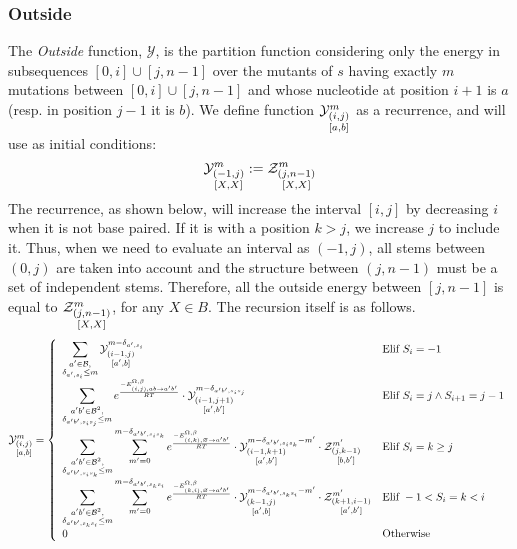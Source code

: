\subsubsection{Outside}	
The \emph{Outside} function, $\mathcal Y$, is the partition function considering only the 
energy in subsequences $[0,i]\cup[j,n-1]$ over the mutants of $s$ having exactly $m$ mutations between $[0,i]\cup[j,n-1]$ and whose nucleotide at position $i+1$ is $a$ 
(resp. in position $j-1$ it is $b$).
We define function $\Y{i,j}{m}{a,b}$ as a recurrence, and will use as initial conditions:
\begin{equation}
	\Y{-1,j}{m}{X,X}:=
		\displaystyle
	  \Z{j,n-1}{m}{X,X}
\label{eq:Y_in}
\end{equation}
The recurrence, as shown below, will increase the interval $[i,j]$ by decreasing $i$ when
it is not base paired. If it is with a position $k>j$, we increase $j$ to include it.
 Thus, when we need
to evaluate an interval as $(-1,j)$, all stems between $(0,j)$ are taken into account and the
structure between $(j,n-1)$ must be a set of independent stems. Therefore,
 all the outside energy between $[j,n-1]$ is
equal to $\Z{j,n-1}{m}{X,X}$, for any $X\in B$. The recursion itself is as follows.
\begin{equation}
	\Y{i,j}{m}{a,b} = \left\{
  \begin{array}{ll}
		\displaystyle
    \sum_{\substack{a'\in \B,\\ \Kron_{a',s_i}\le m}}
    \Y{i-1,j}{m- \Kron_{a',s_i}}{a',b} &
    \text{Elif }S_i=-1 \\
    \displaystyle
    \sum_{\substack{a'b'\in \B^2,\\ \Kron_{a'b',s_is_j}\le m}}
		 e^{\frac{-E_{(i,j),ab \to a'b'}^{\Omega,\beta}}{RT}}\cdot
    \Y{i-1,j+1}{m- \Kron_{a'b',s_is_j}}{a',b'} &
   	 \text{Elif }S_{i}=j \land S_{i+1}=j-1\\
		 \displaystyle
		 \sum_{\substack{a'b'\in \B^2,\\ \Kron_{a'b',s_is_k}\le m}}
		 \sum_{m'=0}^{m-\Kron_{a'b',s_is_k}}
  		 e^{\frac{-E_{(i,k),\varnothing\to a'b'}^{\Omega,\beta}}{RT}}
		 \cdot\Y{i-1,k+1}{m- \Kron_{a'b',s_is_k} - m'}{a',b'}
     \cdot\Z{j,k-1}{m'}{b,b'} &
		 \text{Elif }S_{i}=k \geq j\\
		 \displaystyle
		 \sum_{\substack{a'b'\in \B^2,\\ \Kron_{a'b',s_ks_i}\le m}}
		 \sum_{m'=0}^{m-\Kron_{a'b',s_ks_i}}
   	 e^{\frac{-E_{(k,i),\varnothing\to a'b'}^{\Omega,\beta}}{RT}}
		 \cdot\Y{k-1,j}{m- \Kron_{a'b',s_ks_i} - m'}{a',b}
     \cdot\Z{k+1,i-1}{m'}{a',b'} &
		 \text{Elif }-1 < S_{i}=k < i\\
		 0 & \text{Otherwise}
  \end{array}\right.
\label{eq:Y_rec}
\end{equation}
